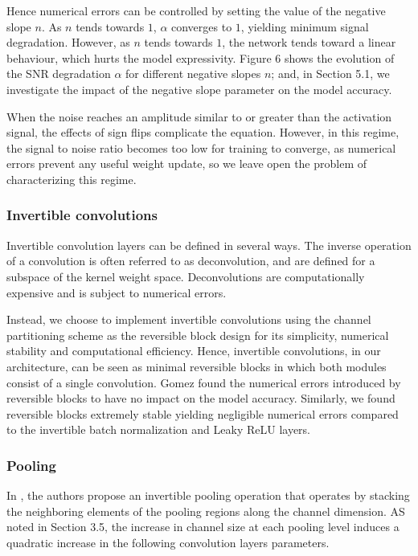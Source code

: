 \documentclass[twocolumn]{bmcart}
\begin{document}
Hence numerical errors can be controlled by setting the value of the negative slope $n$.
As $n$ tends towards $1$, $\alpha$ converges to $1$, yielding minimum signal degradation.
However, as $n$ tends towards $1$, the network tends toward a linear behaviour, which hurts the model expressivity. 
Figure 6 shows the evolution of the SNR degradation $\alpha$ for different negative slopes $n$; 
and, in Section 5.1, we investigate the impact of the negative slope parameter on the model accuracy.

When the noise reaches an amplitude similar to or greater than the activation signal,
the effects of sign flips complicate the equation. 
However, in this regime, the signal to noise ratio becomes too low for training to converge,
as numerical errors prevent any useful weight update, so we leave open the problem of characterizing this regime.

\subsubsection{Invertible convolutions}

Invertible convolution layers can be defined in several ways.
The inverse operation of a convolution is often referred to as deconvolution,
and are defined for a subspace of the kernel weight space.
Deconvolutions are computationally expensive and is subject to numerical errors.

Instead, we choose to implement invertible convolutions using the channel partitioning scheme as the reversible block design for its simplicity, 
numerical stability and computational efficiency.
Hence, invertible convolutions, in our architecture, can be seen as minimal reversible blocks
 in which both modules consist of a single convolution.
Gomez \etal \cite{gomez2017reversible} found the numerical errors introduced by reversible blocks to have no impact on the model accuracy. 
Similarly, we found reversible blocks extremely stable yielding negligible numerical errors
compared to the invertible batch normalization and Leaky ReLU layers.

\subsubsection{Pooling}

In \cite{jacobsen2018revnet}, the authors propose an invertible pooling operation that operates
by stacking the neighboring elements of the pooling regions along the channel dimension.
AS noted in Section 3.5, the increase in channel size at each pooling level induces a quadratic increase in the following convolution layers parameters.
\end{document}
